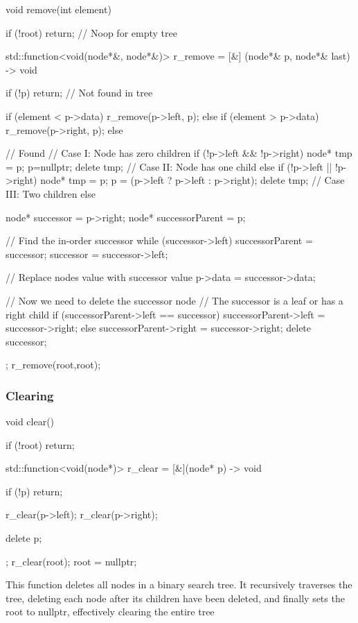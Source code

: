 \documentclass{report}
\begin{document}
\begin{cppcode}
    void remove(int element) {
        if (!root) return; // Noop for empty tree

        std::function<void(node*&, node*&)> r_remove = [&] (node*& p, node*& last) -> void {
            if (!p) return; // Not found in tree

            if (element < p->data) {
                r_remove(p->left, p);
            } else if (element > p->data) {
                r_remove(p->right, p);
            } else { // Found
                // Case I: Node has zero children 
                if (!p->left && !p->right) {
                    node* tmp = p;
                    p=nullptr;
                    delete tmp;
                    // Case II: Node has one child
                } else if (!p->left || !p->right) {
                    node* tmp = p;
                    p = (p->left ? p->left : p->right);
                    delete tmp;
                    // Case III: Two children
                } else {    
                    node* successor = p->right;
                    node* successorParent = p;

                    // Find the in-order successor 
                    while (successor->left) {
                        successorParent = successor;
                        successor = successor->left;
                    }

                    // Replace nodes value with successor value
                    p->data = successor->data;

                    // Now we need to delete the successor node
                    // The successor is a leaf or has a right child
                    if (successorParent->left == successor) {
                        successorParent->left = successor->right; 
                    } else {
                        successorParent->right = successor->right; 
                    }
                    delete successor;
                }
            }
        };
        r_remove(root,root);
    }
    \end{cppcode}
    \pagebreak 
    \subsubsection{Clearing}
    \bigbreak \noindent 
    \begin{cppcode}
        void clear() {
            if (!root) return;

            std::function<void(node*)> r_clear = [&](node* p) -> void {
                if (!p) return;

                r_clear(p->left);
                r_clear(p->right);

                delete p;
            };
            r_clear(root);
            root = nullptr;
        }
    \end{cppcode}
    \bigbreak \noindent 
    This function deletes all nodes in a binary search tree. It recursively traverses the tree, deleting each node after its children have been deleted, and finally sets the root to nullptr, effectively clearing the entire tree
\end{document}
